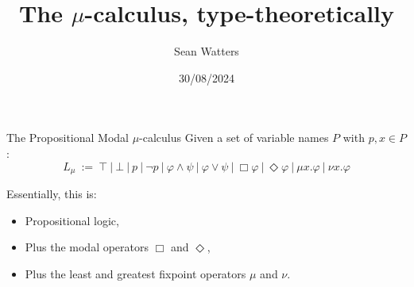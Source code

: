 \documentclass[aspectratio=43]{beamer}
\title[The $\mu$-calculus, type-theoretically]{The $\mu$-calculus, type-theoretically}
\author[S. Watters]{Sean Watters}
\institute{University of Strathclyde}
\date{30/08/2024}
\begin{document}
\begin{frame}
  \titlepage{}
\end{frame}










\begin{frame}{The Propositional Modal $\mu$-calculus}
  Given a set of variable names $P$ with $p,x \in P$ :
\begin{equation*}
L_{\mu}~:=~\top~|~\bot~|~p~|~\lnot p~|~\varphi \land \psi~|~\varphi \lor \psi~|~\Box \varphi~|~\Diamond \varphi~|~\mu{}x.\varphi{}~|~\nu{}x.\varphi{}
\end{equation*}

\bigskip

Essentially, this is:
\begin{itemize}
  \item Propositional logic,
  \item Plus the modal operators $\Box$ and $\Diamond$,
  \item Plus the least and greatest fixpoint operators $\mu$ and $\nu$.
\end{itemize}
\end{frame}
\end{document}

